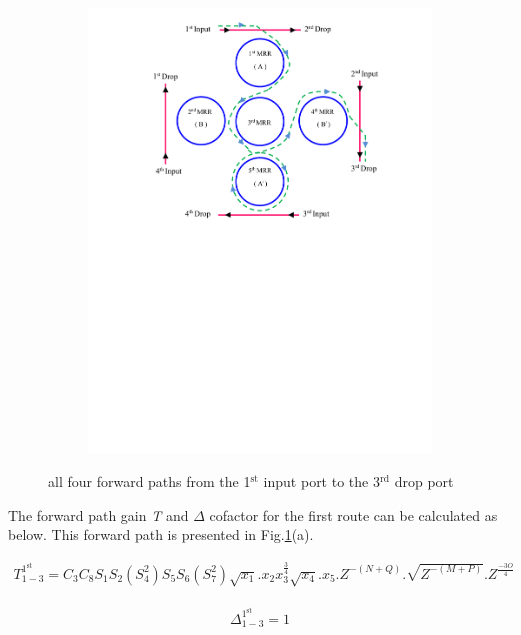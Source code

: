 \documentclass{osa-article}
\begin{document}
\begin{figure}[h!]
\begin{subfigure}[b]{0.4\linewidth}
    \includegraphics[width=\linewidth]{figs/fig4a_ID134.pdf}
    \caption{}
  \end{subfigure}
  \caption{all four forward paths from the 1$^{\text{st}}$ input port to the 3$^{\text{rd}}$ drop port}
  \label{fig4a}
\end{figure}
The forward path gain \textit {T} and $\Delta$ cofactor for the first route can be calculated as below. This forward path is presented in Fig.\ref{fig4a}(a).

\begin{equation}
\begin{split}
T^{1^{\text{st}}}_{1-3}=C_3C_8S_1S_2(S^2_4)S_5S_6(S^2_7)\sqrt{x_1}.x_{2}{x^{\frac{3}{4}}_3}\sqrt{x_4}.x_{5}.Z^{-(N+Q)}.\sqrt{Z^{-(M+P)}}.Z^{\frac{-3O}{4}}
\end{split}
\end{equation}

\begin{equation}
\begin{split}
\Delta^{1^{\text{st}}}_{1-3}=1
\end{split}
\end{equation}
\end{document}
